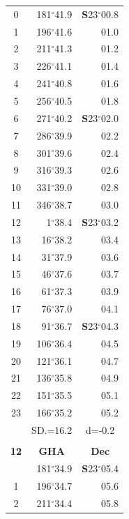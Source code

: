 \documentclass[10pt, a4paper]{report}
\begin{document}
\begin{scriptsize}
\begin{tabular*}{0.2\textwidth}[t]{@{\extracolsep{\fill}}|c|rr|}
0 & 181$^\circ$41.9 & \textbf{S}23$^\circ$00.8\\
1 & 196$^\circ$41.6 & 01.0\\
2 & 211$^\circ$41.3 & 01.2\\
3 & 226$^\circ$41.1 & \raisebox{0.24ex}{\boldmath$\cdot$~\boldmath$\cdot$~~}01.4\\
4 & 241$^\circ$40.8 & 01.6\\
5 & 256$^\circ$40.5 & 01.8\\[2Pt]
6 & 271$^\circ$40.2 & \textbf{S}23$^\circ$02.0\\
7 & 286$^\circ$39.9 & 02.2\\
8 & 301$^\circ$39.6 & 02.4\\
9 & 316$^\circ$39.3 & \raisebox{0.24ex}{\boldmath$\cdot$~\boldmath$\cdot$~~}02.6\\
10 & 331$^\circ$39.0 & 02.8\\
11 & 346$^\circ$38.7 & 03.0\\[2Pt]
12 & 1$^\circ$38.4 & \textbf{S}23$^\circ$03.2\\
13 & 16$^\circ$38.2 & 03.4\\
14 & 31$^\circ$37.9 & 03.6\\
15 & 46$^\circ$37.6 & \raisebox{0.24ex}{\boldmath$\cdot$~\boldmath$\cdot$~~}03.7\\
16 & 61$^\circ$37.3 & 03.9\\
17 & 76$^\circ$37.0 & 04.1\\[2Pt]
18 & 91$^\circ$36.7 & \textbf{S}23$^\circ$04.3\\
19 & 106$^\circ$36.4 & 04.5\\
20 & 121$^\circ$36.1 & 04.7\\
21 & 136$^\circ$35.8 & \raisebox{0.24ex}{\boldmath$\cdot$~\boldmath$\cdot$~~}04.9\\
22 & 151$^\circ$35.5 & 05.1\\
23 & 166$^\circ$35.2 & 05.2\\
\hline
\rule{0pt}{2.4ex} & \multicolumn{1}{c}{SD.=16.2} & \multicolumn{1}{c|}{d=-0.2}\\
\hline
\multicolumn{1}{c}{}\\[-0.5ex]\hline
\multicolumn{1}{|c|}{\rule{0pt}{2.6ex}\textbf{12}} & \multicolumn{1}{c}{\textbf{GHA}} & \multicolumn{1}{c|}{\textbf{Dec}}\\
\hline\rule{0pt}{2.6ex}\noindent
0 & 181$^\circ$34.9 & \textbf{S}23$^\circ$05.4\\
1 & 196$^\circ$34.7 & 05.6\\
2 & 211$^\circ$34.4 & 05.8\\

\end{tabular*}
\end{scriptsize}
\end{document}
